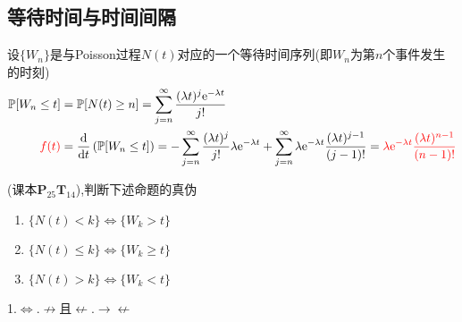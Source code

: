 \documentclass{elegantbook}
\newcommand\p{\mathbb{P}}
\newcommand\e{\mathrm{e}}
\begin{document}
\subsection{等待时间与时间间隔}
\begin{example}
    设$\{W_n\}$是与Poisson过程$N(t)$对应的一个等待时间序列(即$W_n$为第$n$个事件发生的时刻)
    \[\begin{aligned}
        \p [W_n\leq t]&=\p [N(t)\geq n]=\sum_{j=n}^{\infty}\frac{(\lambda t)^j\e ^{-\lambda t}}{j!}\\
        \textcolor{red}{f(t)}&=\frac{\mathrm{d}}{\mathrm{d}t}\left(\p [W_n\leq t]\right)=-\sum_{j=n}^{\infty}\frac{(\lambda t)^j}{j!}\lambda \e ^{-\lambda t}+\sum_{j=n}^{\infty}\lambda \e ^{-\lambda t}\frac{(\lambda t)^{j-1}}{(j-1)!}=\color{red}\lambda \e ^{-\lambda t}\frac{(\lambda t)^{n-1}}{(n-1)!}
    \end{aligned}\]
\end{example}
\begin{example}
    (课本$\mathbf{P}_{25}\mathbf{T}_{14}$),判断下述命题的真伪
    \begin{enumerate}
        \item $\{N(t)<k\}\Leftrightarrow \{W_k>t\}$
        \item $\{N(t)\leq k\}\Leftrightarrow \{W_k\geq t\}$
        \item $\{N(t)>k\}\Leftrightarrow \{W_k<t\}$
    \end{enumerate}
    \begin{solution}
        1.$\Leftrightarrow$.$\nrightarrow$且$\nleftarrow$.$\rightarrow \nleftarrow$
    \end{solution}
\end{example}
\end{document}
